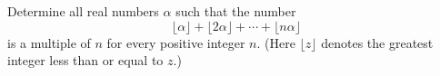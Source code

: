 Determine all real numbers $\alpha$ such that the number
\[ \lfloor \alpha \rfloor + \lfloor 2\alpha \rfloor + \cdots + \lfloor n\alpha \rfloor \]
is a multiple of $n$ for every positive integer $n$. (Here $\lfloor z \rfloor$ denotes the greatest integer less than or equal to $z$.)
